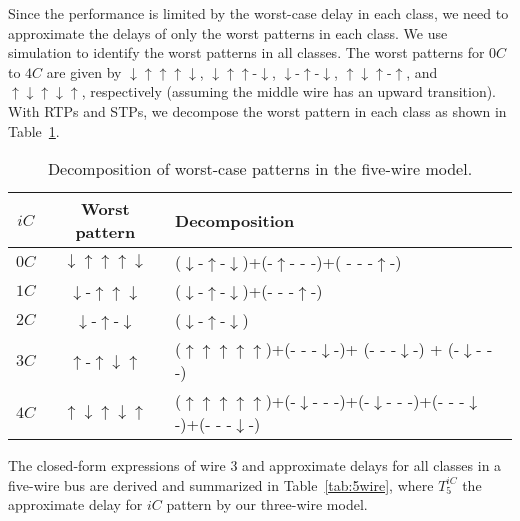 \documentclass[10pt,journal]{IEEEtran}
\begin{document}
Since the performance is limited by the worst-case delay in each class, we need to approximate the delays of only the worst patterns in each class.
We use simulation to identify the worst patterns in all classes.
The worst patterns for $0C$ to $4C$ are given by $\downarrow \uparrow \uparrow \uparrow \downarrow$, $\downarrow \uparrow \uparrow$-$\downarrow$, $\downarrow$-$\uparrow$-$\downarrow$, $\uparrow \downarrow \uparrow$-$\uparrow$, and $\uparrow \downarrow \uparrow \downarrow \uparrow$, respectively (assuming the middle wire has an upward transition). With RTPs and STPs, we decompose the worst pattern in each class as shown in Table~\ref{tab:decomp}.
\begin{table}
\caption{Decomposition of worst-case patterns in the five-wire model.} \label{tab:decomp}
\begin{center}
\begin{tabular}{|c|c|l|}
\hline
$iC$ & Worst pattern & Decomposition\\
\hline
$0C$ & $\downarrow \uparrow \uparrow \uparrow \downarrow$ & ($\downarrow$-$\uparrow$-$\downarrow$)+(-$\uparrow$- - -)+( - - -$\uparrow$-)\\
\hline
$1C$ & $\downarrow$-$\uparrow \uparrow \downarrow$ & ($\downarrow$-$\uparrow$-$\downarrow$)+(- - -$\uparrow$-)\\
\hline
$2C$ & $\downarrow$-$\uparrow$-$\downarrow$ & ($\downarrow$-$\uparrow$-$\downarrow$)\\
\hline
$3C$ & $\uparrow$-$\uparrow \downarrow \uparrow$ & ($\uparrow \uparrow \uparrow \uparrow \uparrow$)+(- - -$\downarrow$-)+ (- - -$\downarrow$-) + (-$\downarrow$- - -)\\
\hline
$4C$ & $\uparrow \downarrow \uparrow \downarrow \uparrow$ & ($\uparrow \uparrow \uparrow \uparrow \uparrow$)+(-$\downarrow$- - -)+(-$\downarrow$- - -)+(- - -$\downarrow$-)+(- - -$\downarrow$-)\\
\hline
\end{tabular}
\end{center}
\end{table}


The closed-form expressions of wire 3 and approximate delays for all classes in a five-wire bus are derived and summarized in Table~\ref{tab:5wire}, where $T^{iC}_5$ the approximate delay for $iC$ pattern by our three-wire model.
\end{document}
